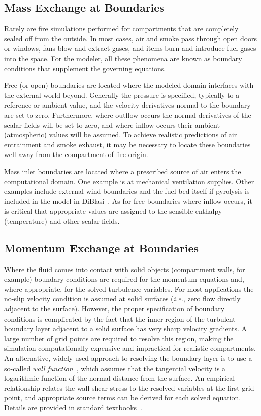 \documentclass[graybox]{svmult}
\begin{document}
\subsection{Mass Exchange at Boundaries}

Rarely are fire simulations performed for compartments that are completely sealed off from the outside. In most cases, air and smoke pass through open doors or windows, fans blow and extract gases, and items burn and introduce fuel gases into the space. For the modeler, all these phenomena are known as boundary conditions that supplement the governing equations.

Free (or open) boundaries are located where the modeled domain interfaces with the external world beyond. Generally the pressure is specified, typically to a reference or ambient value, and the velocity derivatives normal to the boundary are set to zero. Furthermore, where outflow occurs the normal derivatives of the scalar fields will be set to zero, and where inflow occurs their ambient (atmospheric) values will be assumed. To achieve realistic predictions of air entrainment and smoke exhaust, it may be necessary to locate these boundaries well away from the compartment of fire origin.

Mass inlet boundaries are located where a prescribed source of air enters the computational domain. One example is at mechanical ventilation supplies. Other examples include external wind boundaries and the fuel bed itself if pyrolysis is included in the model in DiBlasi~\cite{DiBlasi}. As for free boundaries where inflow occurs, it is critical that appropriate values are assigned to the sensible enthalpy (temperature) and other scalar fields.

\subsection{Momentum Exchange at Boundaries}

Where the fluid comes into contact with solid objects (compartment walls, for example) boundary conditions are required for the momentum equations and, where appropriate, for the solved turbulence variables. For most applications  the  no-slip  velocity  condition  is  assumed at solid surfaces ({\em i.e.}, zero flow directly adjacent to the surface). However, the proper specification of boundary conditions is complicated by the fact that the inner region of the turbulent boundary layer adjacent to a solid surface has very sharp velocity gradients. A large number of grid points are required to resolve this region, making the simulation computationally expensive and impractical for realistic compartments. An alternative, widely used approach to resolving the boundary layer is to use a so-called {\em wall function}~\cite{Launder}, which assumes that the tangential velocity is a logarithmic function of the normal distance from the surface. An empirical relationship relates the wall shear-stress to the resolved variables at the first grid point, and appropriate source terms can be derived for each solved equation. Details are provided in standard textbooks~\cite{Wilcox}.
\end{document}
